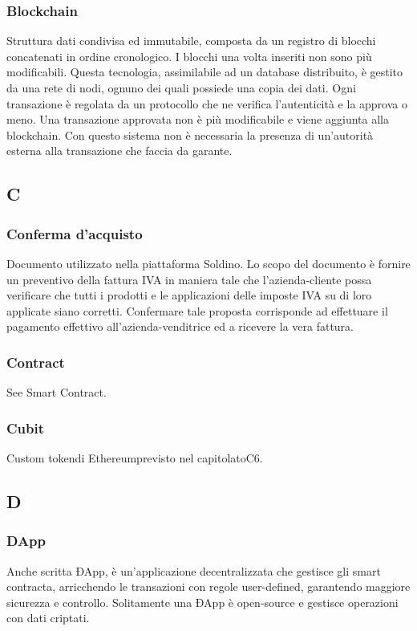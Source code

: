 \subsubsection*{Blockchain}
Struttura dati condivisa ed immutabile, composta da un registro di blocchi concatenati in ordine cronologico. I blocchi una volta inseriti non sono più modificabili. Questa tecnologia, assimilabile ad un database distribuito, è gestito da una rete di nodi, ognuno dei quali possiede una copia dei dati.  Ogni transazione è regolata da un protocollo che ne verifica l'autenticità e la approva o meno. Una transazione approvata non è più modificabile e viene aggiunta alla blockchain. Con questo sistema non è necessaria la presenza di un'autorità esterna alla transazione che faccia da garante.


\subsection*{C}

\subsubsection*{Conferma d'acquisto}
Documento utilizzato nella piattaforma Soldino. Lo scopo del documento è fornire un preventivo della fattura IVA in maniera tale che l'azienda-cliente possa verificare che tutti i prodotti e le applicazioni delle imposte IVA su di loro applicate siano corretti. Confermare tale proposta corrisponde ad effettuare il pagamento effettivo all'azienda-venditrice ed a ricevere la vera fattura.

\subsubsection*{Contract}
See Smart Contract. 

\subsubsection*{Cubit}
Custom token\glosp di Ethereum\glosp previsto nel capitolato\glosp C6.

\subsection*{D}

\subsubsection*{DApp}
Anche scritta ÐApp, è un'applicazione decentralizzata che gestisce gli smart contracta\glo, arricchendo le transazioni con regole user-defined, garantendo maggiore sicurezza e controllo. Solitamente una ÐApp è open-source e  gestisce operazioni con dati criptati.

